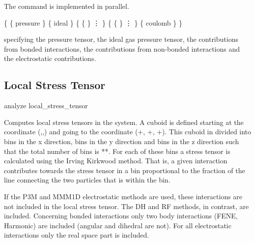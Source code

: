 The command is implemented in parallel.


\begin{code}
\{ \{ pressure  \}
   \{ ideal  \} 
   \{ \{   \}
      \vdots
   \}
   \{ \{   \}
      \vdots
   \}
   \{ coulomb  \}
\}
\end{code}
specifying the pressure tensor, the ideal gas pressure tensor, the
contributions from bonded interactions, the contributions from
non-bonded interactions and the electrostatic contributions.

\subsection{Local Stress Tensor}
\label{analyze:localstresstensor}

\begin{essyntax}
  analyze local_stress_tensor             
\end{essyntax}

Computes local stress tensors in the system.  A cuboid is defined starting at the coordinate
(,,) and going to the coordinate
(+, +,
+).  This cuboid in divided into  bins in the x
direction,  bins in the y direction and  bins in the z direction such that
the total number of bins is **.  For each of these bins a stress
tensor is calculated using the Irving Kirkwood method.  That is, a given interaction contributes
towards the stress tensor in a bin proportional to the fraction of the line connecting the two
particles that is within the bin.

If the P3M and MMM1D electrostatic methods are used, these interactions are not included in the
local stress tensor.  The DH and RF methods, in contrast, are included. Concerning bonded interactions
only two body interactions (FENE, Harmonic) are included (angular and dihedral are not).
For all electrostatic interactions only the real space part is included.

